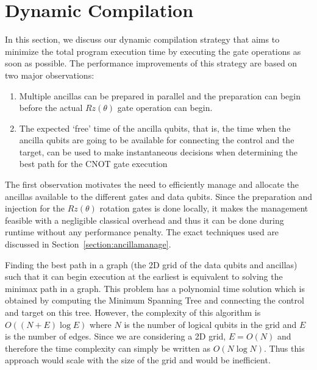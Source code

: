 \section{Dynamic Compilation}
In this section, we discuss our dynamic compilation strategy that aims to minimize the total program execution time by executing the gate operations as soon as possible. The performance improvements of this strategy are based on two major observations:
\begin{enumerate}
    \item Multiple ancillas can be prepared in parallel and the preparation can begin before the actual $Rz(\theta)$ gate operation can begin.
    \item The expected `free' time of the ancilla qubits, that is, the time when the ancilla qubits are going to be available for connecting the control and the target, can be used to make instantaneous decisions when determining the best path for the CNOT gate execution
\end{enumerate}
The first observation motivates the need to efficiently manage and allocate the ancillas available to the different gates and data qubits. Since the preparation and injection for the $Rz(\theta)$ rotation gates is done locally, it makes the management feasible with a negligible classical overhead and thus it can be done during runtime without any performance penalty. The exact techniques used are discussed in Section~\ref{section:ancillamanage}.\par
Finding the best path in a graph (the 2D grid of the data qubits and ancillas) such that it can begin execution at the earliest is equivalent to solving the minimax path in a graph. This problem has a polynomial time solution which is obtained by computing the Minimum Spanning Tree and connecting the control and target on this tree. However, the complexity of this algorithm is $O((N + E)\log{E})$ where $N$ is the number of logical qubits in the grid and $E$ is the number of edges. Since we are considering a 2D grid, $E = O(N)$ and therefore the time complexity can simply be written as $O(N\log{N})$. Thus this approach would scale with the size of the grid and would be inefficient. %

